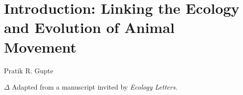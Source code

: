 
{}%
\chapter{Introduction: Linking the Ecology and Evolution of Animal Movement}\label{ch:introduction}

{{Pratik R. Gupte}}

\medskip

{\noindent \large{$\Delta$}} Adapted from a manuscript invited by \textit{Ecology Letters}.

\medskip





